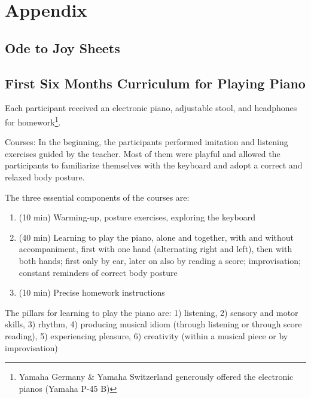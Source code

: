 \chapter{Appendix}
\label{cap:Appendix}
\section{Ode to Joy Sheets}
\label{cap:Ode}


\section{First Six Months Curriculum for Playing Piano}
\label{cap:Curriculum}
Each participant received an electronic piano, adjustable stool, and headphones for homework\footnote{Yamaha Germany \& Yamaha Switzerland generously offered the electronic pianos (Yamaha P-45 B)}.
	
Courses: In the beginning, the participants performed imitation and listening exercises guided by the teacher. Most of them were playful and allowed the participants to familiarize themselves with the keyboard and adopt a correct and relaxed body posture. 

The three essential components of the courses are:
\begin{enumerate}
 \item (10 min) Warming-up, posture exercises, exploring the keyboard
\item (40 min) Learning to play the piano, alone and together, with and without
	accompaniment, first with one hand (alternating right and left), then with both hands; first only by ear, later on also by reading a score; improvisation; constant reminders of correct body posture
\item (10 min) Precise homework instructions
\end{enumerate}
The pillars for learning to play the piano are: 1) listening, 2) sensory and motor skills, 3) rhythm, 4) producing musical idiom (through listening or through score reading), 5) experiencing pleasure, 6) creativity (within a musical piece or by improvisation)


